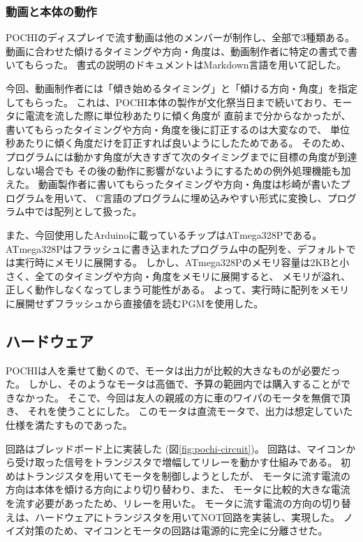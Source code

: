 \subsubsection{動画と本体の動作}
POCHIのディスプレイで流す動画は他のメンバーが制作し、全部で3種類ある。
動画に合わせた傾けるタイミングや方向・角度は、動画制作者に特定の書式で書いてもらった。
書式の説明のドキュメントはMarkdown言語を用いて記した。

今回、動画制作者には「傾き始めるタイミング」と「傾ける方向・角度」を指定してもらった。
これは、POCHI本体の製作が文化祭当日まで続いており、モータに電流を流した際に単位秒あたりに傾く角度が
直前まで分からなかったが、書いてもらったタイミングや方向・角度を後に訂正するのは大変なので、
単位秒あたりに傾く角度だけを訂正すれば良いようにしたためである。
そのため、プログラムには動かす角度が大きすぎて次のタイミングまでに目標の角度が到達しない場合でも
その後の動作に影響がないようにするための例外処理機能も加えた。
動画製作者に書いてもらったタイミングや方向・角度は杉崎が書いたプログラムを用いて、
C言語のプログラムに埋め込みやすい形式に変換し、プログラム中では配列として扱った。

また、今回使用したArduinoに載っているチップはATmega328Pである。
ATmega328Pはフラッシュに書き込まれたプログラム中の配列を、デフォルトでは実行時にメモリに展開する。
しかし、ATmega328Pのメモリ容量は2KBと小さく、全てのタイミングや方向・角度をメモリに展開すると、
メモリが溢れ、正しく動作しなくなってしまう可能性がある。
よって、実行時に配列をメモリに展開せずフラッシュから直接値を読むPGMを使用した。

\subsection{ハードウェア}
POCHIは人を乗せて動くので、モータは出力が比較的大きなものが必要だった。
しかし、そのようなモータは高価で、予算の範囲内では購入することができなかった。
そこで、今回は友人の親戚の方に車のワイパのモータを無償で頂き、
それを使うことにした。
このモータは直流モータで、出力は想定していた仕様を満たすものであった。

回路はブレッドボード上に実装した (図\ref{fig:pochi-circuit})。
回路は、マイコンから受け取った信号をトランジスタで増幅してリレーを動かす仕組みである。
初めはトランジスタを用いてモータを制御しようとしたが、
モータに流す電流の方向は本体を傾ける方向により切り替わり、また、
モータに比較的大きな電流を流す必要があったため、リレーを用いた。
モータに流す電流の方向の切り替えは、ハードウェアにトランジスタを用いてNOT回路を実装し、実現した。
ノイズ対策のため、マイコンとモータの回路は電源的に完全に分離させた。

